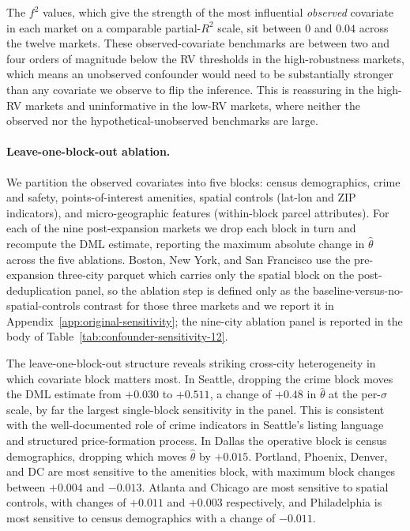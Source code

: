 The $f^2$ values, which give the strength of the most influential
\emph{observed} covariate in each market on a comparable
partial-$R^2$ scale, sit between $0$ and $0.04$ across the twelve
markets. These observed-covariate benchmarks are between two and
four orders of magnitude below the RV thresholds in the
high-robustness markets, which means an unobserved confounder would
need to be substantially stronger than any covariate we observe to
flip the inference. This is reassuring in the high-RV markets and
uninformative in the low-RV markets, where neither the observed nor
the hypothetical-unobserved benchmarks are large.

\paragraph{Leave-one-block-out ablation.}
We partition the observed covariates into five blocks: census
demographics, crime and safety, points-of-interest amenities, spatial
controls (lat-lon and ZIP indicators), and micro-geographic features
(within-block parcel attributes). For each of the nine
post-expansion markets we drop each block in turn and recompute the
DML estimate, reporting the maximum absolute change in $\hat\theta$
across the five ablations. Boston, New York, and San Francisco use
the pre-expansion three-city parquet which carries only the spatial
block on the post-deduplication panel, so the ablation step is
defined only as the baseline-versus-no-spatial-controls contrast for
those three markets and we report it in
Appendix~\ref{app:original-sensitivity}; the nine-city ablation
panel is reported in the body of Table~\ref{tab:confounder-sensitivity-12}.

The leave-one-block-out structure reveals striking cross-city
heterogeneity in which covariate block matters most. In Seattle,
dropping the crime block moves the DML estimate from $+0.030$ to
$+0.511$, a change of $+0.48$ in $\hat\theta$ at the
per-$\sigma$ scale, by far the largest single-block sensitivity in
the panel. This is consistent with the well-documented role of crime
indicators in Seattle's listing language and structured
price-formation process. In Dallas the operative block is census
demographics, dropping which moves $\hat\theta$ by $+0.015$.
Portland, Phoenix, Denver, and DC are most sensitive to the
amenities block, with maximum block changes between $+0.004$ and
$-0.013$. Atlanta and Chicago are most sensitive to spatial
controls, with changes of $+0.011$ and $+0.003$ respectively, and
Philadelphia is most sensitive to census demographics with a change
of $-0.011$.

